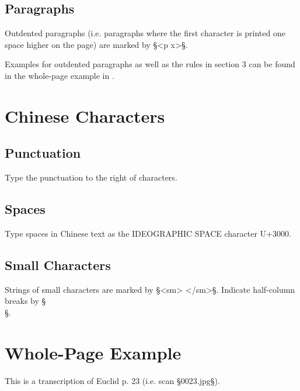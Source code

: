 \documentclass[fontsize=11pt, paper=a4, 
DIV15,
normalheadings,
parskip=half-, 
pointlessnumbers]{scrartcl}
\begin{document}
\subsection{Paragraphs}

Outdented paragraphs (i.e. paragraphs where the first character is printed one space higher on the page) are marked by §<p x>§.

\begin{note}
Examples for outdented paragraphs as well as the rules in section 3 can be found in the whole-page example in .
\end{note}

\section{Chinese Characters}

\subsection{Punctuation}

Type the punctuation to the right of characters.

\subsection{Spaces}

Type spaces in Chinese text as the IDEOGRAPHIC SPACE character U+3000.

\subsection{Small Characters}

Strings of small characters are marked by §<sm> </sm>§. Indicate half-column breaks by §\\§. 




\section{Whole-Page Example}
\label{section example}

This is a transcription of Euclid p. 23 (i.e. scan §0023.jpg§).
\end{document}

